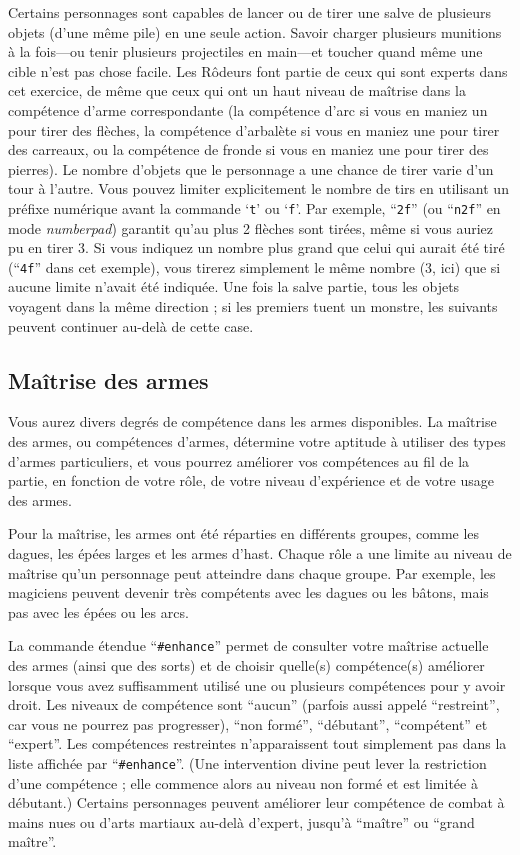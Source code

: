 \documentclass[titlepage]{article}
\begin{document}
Certains personnages sont capables de lancer ou de tirer une salve de plusieurs
objets (d'une même pile) en une seule action.
Savoir charger plusieurs munitions à
la fois---ou tenir plusieurs projectiles en main---et
toucher quand même une cible n'est pas chose facile.
Les Rôdeurs font partie de ceux qui sont experts
dans cet exercice, de même que ceux qui ont un haut niveau de maîtrise dans la
compétence d'arme correspondante (la compétence d'arc si vous en maniez un pour
tirer des flèches, la compétence d'arbalète si vous en maniez une pour tirer des carreaux,
ou la compétence de fronde si vous en maniez une pour tirer des pierres).
Le nombre d'objets que le personnage a une chance de tirer varie d'un
tour à l'autre.  Vous pouvez limiter explicitement le nombre de tirs en utilisant un
préfixe numérique avant la commande `\texttt{t}' ou `\texttt{f}'.
Par exemple, ``\texttt{2f}'' (ou ``\texttt{n2f}'' en mode
\textit{number\textunderscore pad})
garantit qu'au plus 2 flèches sont tirées,
même si vous auriez pu en tirer 3.  Si vous indiquez
un nombre plus grand que celui qui aurait été tiré (``\texttt{4f}'' dans cet exemple),
vous tirerez simplement le même nombre (3, ici) que si aucune limite
n'avait été indiquée.  Une fois la salve partie, tous les objets
voyagent dans la même direction ; si les premiers tuent un monstre,
les suivants peuvent continuer au-delà de cette case.

\subsection*{Maîtrise des armes}

Vous aurez divers degrés de compétence dans les armes disponibles.
La maîtrise des armes, ou compétences d'armes, détermine votre aptitude à utiliser
des types d'armes particuliers, et vous pourrez améliorer vos compétences
au fil de la partie, en fonction de votre rôle, de votre niveau
d'expérience et de votre usage des armes.

Pour la maîtrise, les armes ont
été réparties en différents groupes, comme les dagues, les épées larges et les
armes d'hast.  Chaque rôle a une limite au niveau de maîtrise qu'un personnage
peut atteindre dans chaque groupe.  Par exemple, les magiciens peuvent devenir
très compétents avec les dagues ou les bâtons, mais pas avec les épées ou les arcs.

La commande étendue ``\texttt{\#enhance}'' permet de consulter votre maîtrise
actuelle des armes
(ainsi que des sorts) et de choisir quelle(s) compétence(s) améliorer lorsque
vous avez suffisamment utilisé une ou plusieurs compétences pour y avoir droit.  Les
niveaux de compétence sont ``aucun'' (parfois aussi appelé ``restreint'',
car vous ne pourrez pas progresser), ``non formé'', ``débutant'', ``compétent''
et ``expert''.  Les compétences restreintes n'apparaissent tout simplement pas dans la liste
affichée par ``\texttt{\#enhance}''.
(Une intervention divine peut lever la restriction d'une
compétence ; elle commence alors au niveau non formé et est limitée à débutant.)
Certains personnages peuvent améliorer leur compétence de combat à mains nues ou
d'arts martiaux au-delà d'expert, jusqu'à ``maître'' ou ``grand maître''.
\end{document}
